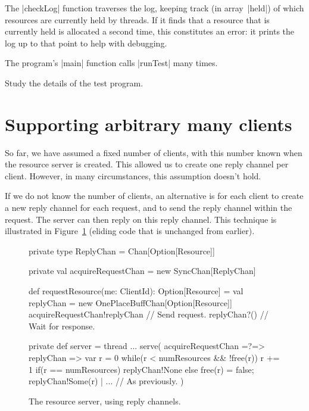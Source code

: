 The |checkLog| function traverses the log, keeping track (in array~|held|) of
which resources are currently held by threads.  If it finds that a resource
that is currently held is allocated a second time, this constitutes an error:
it prints the log up to that point to help with debugging.

The program's |main| function calls |runTest| many times. 

\begin{instruction}
Study the details of the test program.
\end{instruction}


\section{Supporting arbitrary many clients}

So far, we have assumed a fixed number of clients, with this number known when
the resource server is created.  This allowed us to create one reply channel
per client.  However, in many circumstances, this assumption doesn't hold.

If we do not know the number of clients, an alternative is for each client to
create a new reply channel for each request, and to send the reply channel
within the request.  The server can then reply on this reply channel.  
%
This technique is illustrated in Figure~\ref{fig:RAServer-replyChan} (eliding
code that is unchanged from earlier). 


\begin{figure}
\begin{scala}
  private type ReplyChan = Chan[Option[Resource]]

  private val acquireRequestChan = new SyncChan[ReplyChan]

  def requestResource(me: ClientId): Option[Resource] = {
    val replyChan = new OnePlaceBuffChan[Option[Resource]]
    acquireRequestChan!replyChan  // Send request.
    replyChan?() // Wait for response.
  }

  private def server = thread{
    ...
    serve(
      acquireRequestChan =?=> { replyChan => 
	var r = 0
	while(r < numResources && !free(r)) r += 1
	if(r == numResources) replyChan!None
        else{ free(r) = false; replyChan!Some(r) }
      }
      | ... // As previously. 
    )
  }
\end{scala}
\caption{The resource server, using reply channels.}
\label{fig:RAServer-replyChan}
\end{figure}

